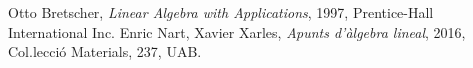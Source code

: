 \documentclass[11pt,fleqn]{book} %
\newcounter{let} \setcounter{let}{0}
\renewcommand{\1}{\mathbf{1}}
\newcommand{\0}{\mathbf{0}}
\begin{document}

%






\begin{thebibliography}{20}
	Otto Bretscher,
	\textit{Linear Algebra with Applications},
	1997, Prentice-Hall International Inc.
	Enric Nart, Xavier Xarles,
	\textit{Apunts d'àlgebra lineal}, 2016, Col.lecci\'o Materials, 237, UAB.
\end{thebibliography}

\printbibliography[heading=bibempty]


\cleardoublepage %
\setlength{\columnsep}{0.75cm} %
\printindex %

\end{document}
